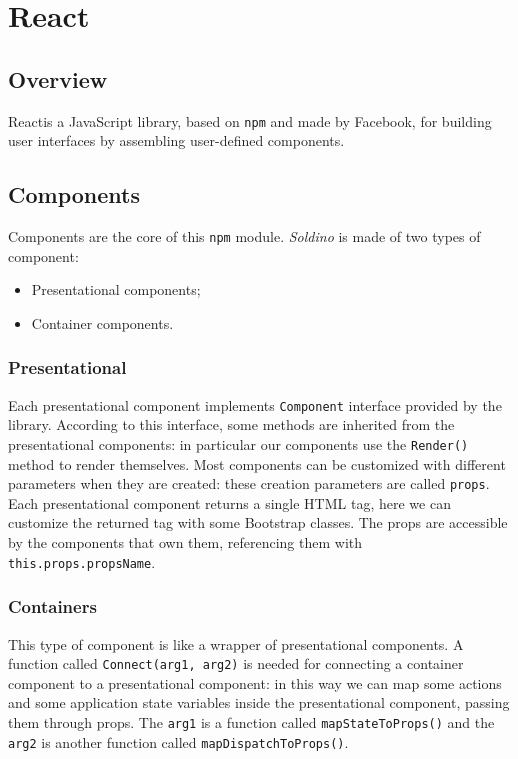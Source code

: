 \section{React} 

\subsection{Overview}
React\glosp is a JavaScript library, based on \texttt{npm} and made by Facebook, for building user interfaces by assembling user-defined components.
\subsection{Components}
Components are the core of this \texttt{npm} module. \textit{Soldino} is made of two types of component:
\begin{itemize}
	\item Presentational components;
	\item Container components.
\end{itemize}
\subsubsection{Presentational}
Each presentational component implements \texttt{Component} interface provided by the library. According to this interface, some methods are inherited from the presentational components: in particular our components use the \texttt{Render()} method to render themselves.
Most components can be customized with different parameters when they are created: these creation parameters are called \texttt{props}. Each presentational component returns a single HTML tag, here we can customize the returned tag with some Bootstrap classes. The props are accessible by the components that own them, referencing them with \texttt{this.props.propsName}.

\subsubsection{Containers} 
This type of component is like a wrapper of presentational components. A function called \texttt{Connect(arg1, arg2)} is needed for connecting a container component to a presentational component: in this way we can map some actions and some application state variables inside the presentational component, passing them through props. The \texttt{arg1} is a function called \texttt{mapStateToProps()} and the \texttt{arg2} is another function called \texttt{mapDispatchToProps()}.
